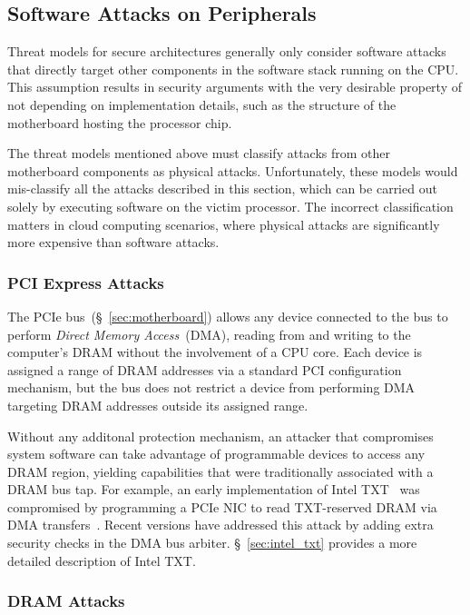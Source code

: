 \subsection{Software Attacks on Peripherals}
\label{sec:device_attacks}

Threat models for secure architectures generally only consider software attacks
that directly target other components in the software stack running on the CPU.
This assumption results in security arguments with the very desirable property
of not depending on implementation details, such as the structure of the
motherboard hosting the processor chip.

The threat models mentioned above must classify attacks from other motherboard
components as physical attacks. Unfortunately, these models would mis-classify
all the attacks described in this section, which can be carried out solely by
executing software on the victim processor. The incorrect classification
matters in cloud computing scenarios, where physical attacks are significantly
more expensive than software attacks.


\subsubsection{PCI Express Attacks}
\label{sec:pcie_attacks}

The PCIe bus~(\S~\ref{sec:motherboard}) allows any device connected to the bus
to perform \textit{Direct Memory Access}~(DMA), reading from and writing to
the computer's DRAM without the involvement of a CPU core. Each device is
assigned a range of DRAM addresses via a standard PCI configuration mechanism,
but the bus does not restrict a device from performing DMA targeting DRAM
addresses outside its assigned range.

Without any additonal protection mechanism, an attacker that compromises system
software can take advantage of programmable devices to access any DRAM region,
yielding capabilities that were traditionally associated with a DRAM bus tap.
For example, an early implementation of Intel TXT~\cite{grawrock2009txt} was
compromised by programming a PCIe NIC to read TXT-reserved DRAM via DMA
transfers~\cite{wojtczuk2011txt}. Recent versions have addressed this attack by
adding extra security checks in the DMA bus arbiter. \S~\ref{sec:intel_txt}
provides a more detailed description of Intel TXT.


\subsubsection{DRAM Attacks}
\label{sec:rowhammer_attack}

